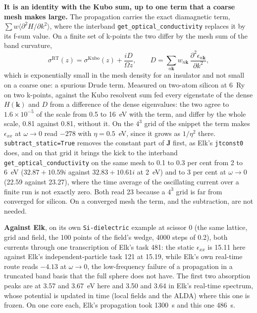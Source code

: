 \documentclass[11pt,a4paper]{article}
\newcommand{\code}[1]{\texttt{\small #1}}
\begin{document}
\textbf{It is an identity with the Kubo sum, up to one term that a coarse mesh
makes large.} The propagation carries the exact diamagnetic term,
$\sum w\langle\partial^2H/\partial k^2\rangle$, where the interband
\code{get\_optical\_conductivity} replaces it by its f-sum value. On a finite set
of k-points the two differ by the mesh sum of the band curvature,
\begin{equation*}
\sigma^{\mathrm{RT}}(z) = \sigma^{\mathrm{Kubo}}(z) + \frac{iD}{\Omega z},
\qquad D = \sum_{n\mathbf k} w_{n\mathbf k}\,\frac{\partial^2\epsilon_{n\mathbf k}}{\partial k^2},
\end{equation*}
which is exponentially small in the mesh density for an insulator and not small
on a coarse one: a spurious Drude term. Measured on two-atom silicon at 6~Ry on
two k-points, against the Kubo resolvent sum fed every eigenstate of the dense
$H(\mathbf k)$ and $D$ from a difference of the dense eigenvalues: the two agree
to $1.6\times10^{-5}$ of the scale from 0.5 to 16~eV with the term, and differ by
the whole scale, 0.81 against 0.81, without it. On the $4^3$ grid of the
snippet the term makes $\epsilon_{xx}$ at $\omega\to0$ read $-278$ with
$\eta = 0.5$~eV, since it grows as $1/\eta^2$ there. \code{subtract\_static=True}
removes the constant part of $\mathbf J$ first, as Elk's \code{jtconst0} does,
and on that grid it brings the kick to the interband
\code{get\_optical\_conductivity} on the same mesh to 0.1 to 0.3 per cent from 2
to 6~eV ($32.87+10.59i$ against $32.83+10.61i$ at 2~eV) and to 3 per cent at
$\omega\to0$ (22.59 against 23.27), where the time average of the oscillating
current over a finite run is not exactly zero. Both read 23 because a $4^3$ grid
is far from converged for silicon. On a converged mesh the term, and the
subtraction, are not needed.

\textbf{Against Elk}, on its own \code{Si-dielectric} example at scissor 0 (the
same lattice, grid and field, the 100 points of the field's wedge, 4000 steps of
0.2), both currents through one transcription of Elk's task 481: the static
$\epsilon_{xx}$ is 15.11 here against Elk's independent-particle task 121 at 15.19,
while Elk's own real-time route reads $-4.13$ at $\omega\to0$, the low-frequency
failure of a propagation in a truncated band basis that the full sphere does not
have. The first two absorption peaks are at 3.57 and 3.67~eV here and 3.50 and
3.64 in Elk's real-time spectrum, whose potential is updated in time (local
fields and the ALDA) where this one is frozen. On one core each, Elk's
propagation took 1300~s and this one 486~s.
\end{document}
